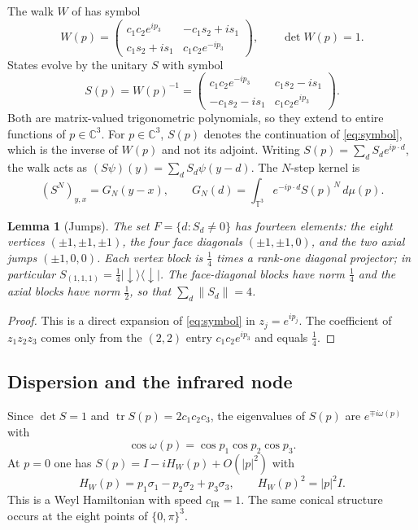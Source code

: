 \documentclass[11pt]{amsart}
\newtheorem{lemma}[theorem]{Lemma}
\theoremstyle{definition}
\theoremstyle{remark}
\newcommand{\C}{\mathbb{C}}
\newcommand{\T}{\mathbb{T}}
\newcommand{\dn}{{\downarrow}}
\newcommand{\cIR}{c_{\mathrm{IR}}}
\newcommand{\tr}{\operatorname{tr}}
\begin{document}
The walk $W$ of \cite[Eq.~(5.15)]{CJWW} has symbol
\[
W(p)=\begin{pmatrix} c_1c_2e^{ip_3} & -c_1s_2+is_1\\ c_1s_2+is_1 & c_1c_2e^{-ip_3}\end{pmatrix},
\qquad \det W(p)=1 .
\]
States evolve by the unitary $S$ with symbol
\begin{equation}\label{eq:symbol}
S(p)=W(p)^{-1}=\begin{pmatrix} c_1c_2e^{-ip_3} & c_1s_2-is_1\\ -c_1s_2-is_1 & c_1c_2e^{ip_3}\end{pmatrix}.
\end{equation}
Both are matrix-valued trigonometric polynomials, so they extend to entire
functions of $p\in\C^3$.  For $p\in\C^3$, $S(p)$ denotes the continuation of
\eqref{eq:symbol}, which is the inverse of $W(p)$ and not its adjoint.
Writing $S(p)=\sum_dS_de^{ip\cdot d}$, the walk acts as
$(S\psi)(y)=\sum_dS_d\psi(y-d)$.  The $N$-step kernel is
\begin{equation}\label{eq:kernel}
(S^N)_{y,x}=G_N(y-x),\qquad G_N(d)=\int_{\T^3}e^{-ip\cdot d}S(p)^N\,d\mu(p).
\end{equation}

\begin{lemma}[Jumps]\label{lem:jumps}
The set $F=\{d:S_d\ne0\}$ has fourteen elements: the eight vertices
$(\pm1,\pm1,\pm1)$, the four face diagonals $(\pm1,\pm1,0)$, and the two
axial jumps $(\pm1,0,0)$.  Each vertex block is $\frac14$ times a rank-one
diagonal projector; in particular $S_{(1,1,1)}=\frac14|\dn\rangle\langle\dn|$.
The face-diagonal blocks have norm $\frac14$ and the axial blocks have norm
$\frac12$, so that $\sum_d\|S_d\|=4$.
\end{lemma}

\begin{proof}
This is a direct expansion of \eqref{eq:symbol} in $z_j=e^{ip_j}$.  The
coefficient of $z_1z_2z_3$ comes only from the $(2,2)$ entry
$c_1c_2e^{ip_3}$ and equals $\frac14$.
\end{proof}

\subsection{Dispersion and the infrared node}
Since $\det S=1$ and $\tr S(p)=2c_1c_2c_3$, the eigenvalues of $S(p)$ are
$e^{\mp i\omega(p)}$ with
\begin{equation}\label{eq:dispersion}
\cos\omega(p)=\cos p_1\cos p_2\cos p_3 .
\end{equation}
At $p=0$ one has $S(p)=I-iH_W(p)+O(|p|^2)$ with
\[
H_W(p)=p_1\sigma_1-p_2\sigma_2+p_3\sigma_3,\qquad H_W(p)^2=|p|^2I .
\]
This is a Weyl Hamiltonian with speed $\cIR=1$.  The same conical structure
occurs at the eight points of $\{0,\pi\}^3$.
\end{document}
